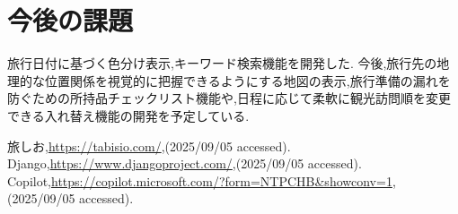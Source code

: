 \documentclass[a4j,twocolumn]{jsarticle}
\begin{document}
\section{今後の課題}
\label{sec:orgb46e780}
旅行日付に基づく色分け表示,キーワード検索機能を開発した.
今後,旅行先の地理的な位置関係を視覚的に把握できるようにする地図の表示,旅行準備の漏れを防ぐための所持品チェックリスト機能や,日程に応じて柔軟に観光訪問順を変更できる入れ替え機能の開発を予定している.




\small\setlength\baselineskip{10pt}
\begin{thebibliography}{9}

 旅しお,\url{https://tabisio.com/},(2025/09/05 accessed).
Django,\url{https://www.djangoproject.com/},(2025/09/05 accessed).
Copilot,\url{https://copilot.microsoft.com/?form=NTPCHB&showconv=1},(2025/09/05 accessed).
\end{thebibliography}
\end{document}
